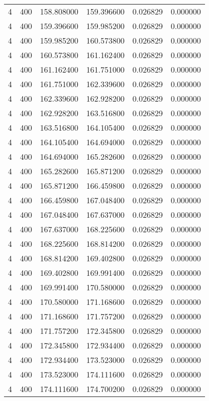 \begin{longtable}{rrrrrr}
4 & 400 & 158.808000 & 159.396600 & 0.026829 & 0.000000 \\
4 & 400 & 159.396600 & 159.985200 & 0.026829 & 0.000000 \\
4 & 400 & 159.985200 & 160.573800 & 0.026829 & 0.000000 \\
4 & 400 & 160.573800 & 161.162400 & 0.026829 & 0.000000 \\
4 & 400 & 161.162400 & 161.751000 & 0.026829 & 0.000000 \\
4 & 400 & 161.751000 & 162.339600 & 0.026829 & 0.000000 \\
4 & 400 & 162.339600 & 162.928200 & 0.026829 & 0.000000 \\
4 & 400 & 162.928200 & 163.516800 & 0.026829 & 0.000000 \\
4 & 400 & 163.516800 & 164.105400 & 0.026829 & 0.000000 \\
4 & 400 & 164.105400 & 164.694000 & 0.026829 & 0.000000 \\
4 & 400 & 164.694000 & 165.282600 & 0.026829 & 0.000000 \\
4 & 400 & 165.282600 & 165.871200 & 0.026829 & 0.000000 \\
4 & 400 & 165.871200 & 166.459800 & 0.026829 & 0.000000 \\
4 & 400 & 166.459800 & 167.048400 & 0.026829 & 0.000000 \\
4 & 400 & 167.048400 & 167.637000 & 0.026829 & 0.000000 \\
4 & 400 & 167.637000 & 168.225600 & 0.026829 & 0.000000 \\
4 & 400 & 168.225600 & 168.814200 & 0.026829 & 0.000000 \\
4 & 400 & 168.814200 & 169.402800 & 0.026829 & 0.000000 \\
4 & 400 & 169.402800 & 169.991400 & 0.026829 & 0.000000 \\
4 & 400 & 169.991400 & 170.580000 & 0.026829 & 0.000000 \\
4 & 400 & 170.580000 & 171.168600 & 0.026829 & 0.000000 \\
4 & 400 & 171.168600 & 171.757200 & 0.026829 & 0.000000 \\
4 & 400 & 171.757200 & 172.345800 & 0.026829 & 0.000000 \\
4 & 400 & 172.345800 & 172.934400 & 0.026829 & 0.000000 \\
4 & 400 & 172.934400 & 173.523000 & 0.026829 & 0.000000 \\
4 & 400 & 173.523000 & 174.111600 & 0.026829 & 0.000000 \\
4 & 400 & 174.111600 & 174.700200 & 0.026829 & 0.000000 \\

\end{longtable}
